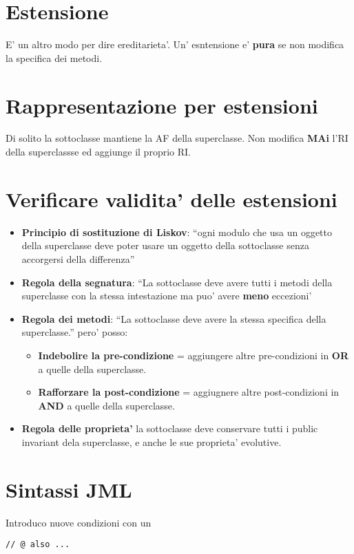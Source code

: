 \documentclass[\main/main.tex]{subfiles}
\begin{document}
\section{Estensione}
E' un altro modo per dire ereditarieta'.
Un' esntensione e' \textbf{pura} se non modifica la specifica dei metodi.

\section{Rappresentazione per estensioni}
Di solito la sottoclasse mantiene la AF della superclasse.
Non modifica \textbf{MAi} l'RI della superclassse ed aggiunge il proprio RI.

\section{Verificare validita' delle estensioni}
\begin{itemize}
\item \textbf{Principio di sostituzione di Liskov}: ``ogni modulo che usa un oggetto della superclasse deve poter usare un oggetto della sottoclasse senza accorgersi della differenza''
\item \textbf{Regola della segnatura}: ``La sottoclasse deve avere tutti i metodi della superclasse con la stessa intestazione ma puo' avere \textbf{meno} eccezioni'
\item \textbf{Regola dei metodi}: ``La sottoclasse deve avere la stessa specifica della superclasse.'' pero' posso:
\begin{itemize}
\item \textbf{Indebolire la pre-condizione} = aggiungere altre pre-condizioni in \textbf{OR} a quelle della superclasse.
\item \textbf{Rafforzare la post-condizione} = aggiugnere altre post-condizioni in \textbf{AND} a quelle della superclasse.
  \end{itemize}
  \item \textbf{Regola delle proprieta'} la sottoclasse deve conservare tutti i public invariant dela superclasse, e anche le sue proprieta' evolutive.
\end{itemize}

\section{Sintassi JML}
Introduco nuove condizioni con un
\begin{verbatim}
// @ also ...
\end{verbatim}
\end{document}
